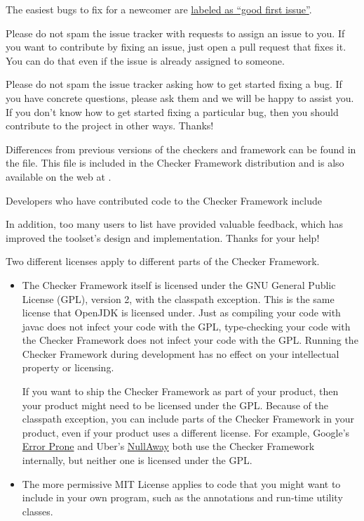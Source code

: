 The easiest bugs to fix for a newcomer are
\href{https://github.com/typetools/checker-framework/issues?q=is\%3Aopen+is\%3Aissue+label\%3A\%22good+first+issue\%22}{labeled
  as ``good first issue''}.

Please do not spam the issue tracker with requests to assign an issue to
you.  If you want to contribute by fixing an issue, just open a pull
request that fixes it.  You can do that even if the issue is already
assigned to someone.

Please do not spam the issue tracker asking how to get started fixing a
bug.  If you have concrete questions, please ask them and we will be happy
to assist you.  If you don't know how to get started fixing a particular
bug, then you should contribute to the project in other ways.  Thanks!



Differences from previous versions of the checkers and framework can be found
in the  file.  This file is included in the
Checker Framework distribution and is also available on the web at
.

Developers who have contributed code to the Checker Framework include


In addition, too many users to list have provided valuable feedback, which
has improved the toolset's design and implementation.
Thanks for your help!



Two different licenses apply to different parts of the Checker Framework.
\begin{itemize}
\item
The Checker Framework itself is licensed under the GNU General Public License
(GPL), version 2, with the classpath exception.
This is the same license that OpenJDK is licensed
under.  Just as compiling your code with javac does not infect your code
with the GPL, type-checking your code with the Checker Framework does not
infect your code with the GPL\@.  Running the Checker Framework during
development has no effect on your intellectual property or licensing.

If you want to ship the Checker Framework as part of your product, then
your product might need to be licensed under the GPL\@.  Because of the
classpath exception, you can include parts of the Checker Framework in your
product, even if your product uses a different license.  For example,
Google's \href{https://github.com/google/error-prone}{Error Prone} and
Uber's \href{https://github.com/uber/NullAway}{NullAway} both use the
Checker Framework internally, but neither one is licensed under the GPL\@.

\item
The more permissive MIT License applies
to code that you might want to include in your own
program, such as the annotations and run-time utility classes.
\end{itemize}

